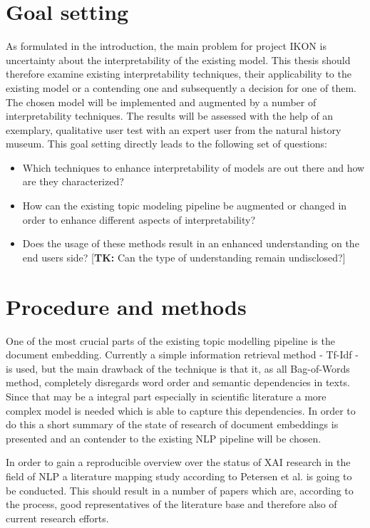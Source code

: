 \documentclass[pdftex,a4paper,12pt]{scrartcl}
\newcommand{\tk}[1]{\textcolor{tim}{[\textbf{TK:} #1]}}
\begin{document}
\section{Goal setting} 
As formulated in the introduction, the main problem for project IKON is uncertainty about the interpretability of the existing model. This thesis should therefore examine existing interpretability techniques, their applicability to the existing model or a contending one and subsequently a decision for one of them. The chosen model will be implemented and augmented by a number of interpretability techniques. The results will be assessed with the help of an exemplary, qualitative user test with an expert user from the natural history museum. This goal setting directly leads to the following set of questions:
\begin{itemize}
	\item Which techniques to enhance interpretability of models are out there and how are they characterized?
	\item How can the existing topic modeling pipeline be augmented or changed in order to enhance different aspects of interpretability?
	\item Does the usage of these methods result in an enhanced understanding on the end users side? \tk{Can the type of understanding remain undisclosed?}
\end{itemize}



\section{Procedure and methods}

One of the most crucial parts of the existing topic modelling pipeline is the document embedding. Currently a simple information retrieval method - Tf-Idf - is used, but the main drawback of the technique is that it, as all Bag-of-Words method, completely disregards word order and semantic dependencies in texts. Since that may be a integral part especially in scientific literature a more complex model is needed which is able to capture this dependencies. In order to do this a short summary of the state of research of document embeddings is presented and an contender to the existing NLP pipeline will be chosen.

In order to gain a reproducible overview over the status of XAI research in the field of NLP a literature mapping study according to Petersen et al. \cite{petersenSystematicMappingStudies} is going to be conducted. This should result in a number of papers which are, according to the process, good representatives of the literature base and therefore also of current research efforts. 
\end{document}
